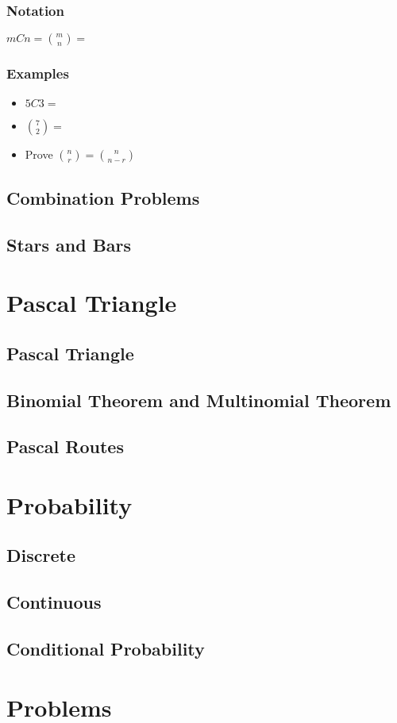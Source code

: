\documentclass{article}
\begin{document}
\subsubsection{Notation}
$mCn={m \choose n}=$
\subsubsection{Examples}
\begin{itemize}
    \item $5C3=$
    \item ${7 \choose 2}=$
    \item Prove $ {n \choose r} = {n \choose n-r} $ 
\end{itemize}
\pagebreak

\subsection{Combination Problems}


\subsection{Stars and Bars}

\section{Pascal Triangle}

\subsection{Pascal Triangle}

\subsection{Binomial Theorem and Multinomial Theorem}

\subsection{Pascal Routes}

\section{Probability}

\subsection{Discrete}

\subsection{Continuous}

\subsection{Conditional Probability}

\section{Problems}
\end{document}
